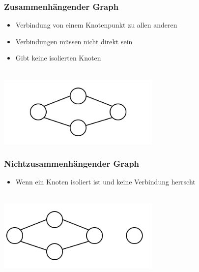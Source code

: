 \begin{minipage}{0.5\textwidth}
\subsubsection*{Zusammenhängender Graph}
\begin{itemize}[leftmargin=*]
\item Verbindung von einem Knotenpunkt zu allen anderen
\item Verbindungen müssen nicht direkt sein
\item Gibt keine isolierten Knoten
\end{itemize}\
\\
\includegraphics[width=0.6\textwidth]{graphics/graph_zusammen.png}
\end{minipage}
\hfill
\begin{minipage}{0.5\textwidth}
\subsubsection*{Nichtzusammenhängender Graph}
\begin{itemize}[leftmargin=*]
\item Wenn ein Knoten isoliert ist und keine Verbindung herrscht
\end{itemize}\
\\
\includegraphics[width=0.6\textwidth]{graphics/graph_nicht_zusammen.png}
\end{minipage}

